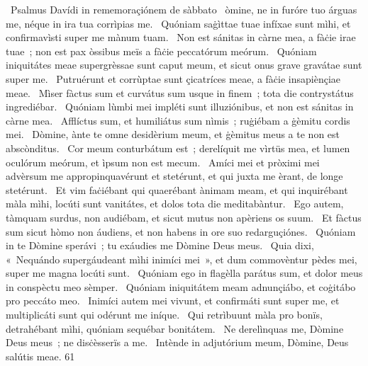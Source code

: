 {~Psalmus Davídi in rememoraçiónem de sàbbato}
{%
~òmine, ne in furóre tuo árguas me, néque in ira tua corrìpias me. 
~Quóniam saġìttae tuae infíxae sunt mìhi, et confirmavìsti super me mànum tuam. 
~Non est sánitas in càrne mea, a fàċie irae tuae~; non est pax òssibus meïs a fàċie peccatórum meórum. 
~Quóniam iniquitátes meae supergrèssae sunt caput meum, et sicut onus grave gravátae sunt super me. 
~Putruérunt et corrùptae sunt çicatríces meae, a fàċie insapiènçiae meae. 
~Mìser fàctus sum et curvátus sum usque in finem~; tota die contrystátus ingrediébar. 
~Quóniam lùmbi mei impléti sunt illuziónibus, et non est sánitas in càrne mea. 
~Afflíctus sum, et humiliátus sum nìmis~; ruġiébam a ġèmitu cordis mei. 
~Dòmine, ànte te omne desidèrium meum, et ġèmitus meus a te non est abscònditus. 
~Cor meum conturbátum est~; derelíquit me vìrtüs mea, et lumen oculórum meórum, et ìpsum non est mecum. 
~Amíci mei et pròximi mei advèrsum me appropinquavérunt et stetérunt, et qui juxta me èrant, de longe stetérunt. 
~Et vim faċiébant qui quaerébant ànimam meam, et qui inquirébant màla mìhi, locúti sunt vanitátes, et dolos tota die meditabàntur. 
~Ego autem, tàmquam surdus, non audiébam, et sicut mutus non apèriens os suum. 
~Et fàctus sum sicut hòmo non áudiens, et non habens in ore suo redarguçiónes. 
~Quóniam in te Dòmine sperávi~; tu exáudies me Dòmine Deus meus. 
~Quia dixi, «~Nequándo supergáudeant mìhi inimíci mei~», et dum commovèntur pèdes mei, super me magna locúti sunt. 
~Quóniam ego in flagèlla parátus sum, et dolor meus in conspèctu meo sèmper. 
~Quóniam iniquitátem meam adnunçiábo, et coġitábo pro peccáto meo. 
~Inimíci autem mei vivunt, et confirmáti sunt super me, et multiplicáti sunt qui odérunt me iníque. 
~Qui retrìbuunt màla pro bonïs, detrahébant mìhi, quóniam sequébar bonitátem. 
~Ne derelìnquas me, Dòmine Deus meus~; ne disċèsserïs a me. 
~Intènde in adjutórium meum, Dòmine, Deus salútis meae. 
}
{6}{1}
